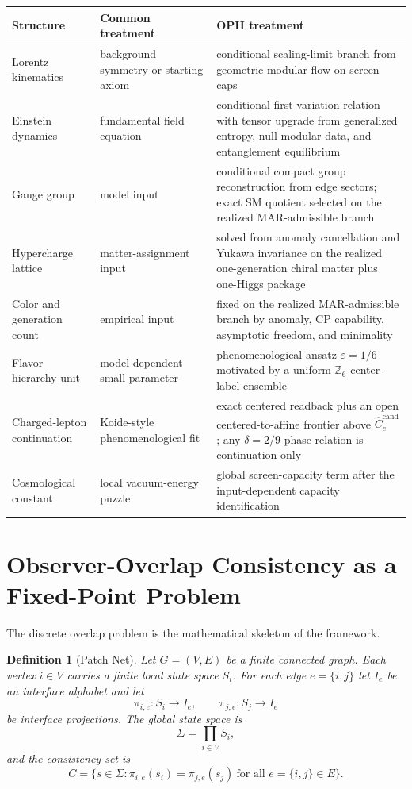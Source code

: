 \documentclass[11pt]{article}
\newtheorem{definition}[theorem]{Definition}
\begin{document}
\begingroup
\footnotesize
\begin{tabular}{@{}>{\raggedright\arraybackslash}p{}>{\raggedright\arraybackslash}p{}>{\raggedright\arraybackslash}p{}@{}}
\toprule
Structure & Common treatment & OPH treatment \\
\midrule
Lorentz kinematics & background symmetry or starting axiom & conditional scaling-limit branch from geometric modular flow on screen caps \\
Einstein dynamics & fundamental field equation & conditional first-variation relation with tensor upgrade from generalized entropy, null modular data, and entanglement equilibrium \\
Gauge group & model input & conditional compact group reconstruction from edge sectors; exact SM quotient selected on the realized MAR-admissible branch \\
Hypercharge lattice & matter-assignment input & solved from anomaly cancellation and Yukawa invariance on the realized one-generation chiral matter plus one-Higgs package \\
Color and generation count & empirical input & fixed on the realized MAR-admissible branch by anomaly, CP capability, asymptotic freedom, and minimality \\
Flavor hierarchy unit & model-dependent small parameter & phenomenological ansatz \(\varepsilon=1/6\) motivated by a uniform \(\mathbb Z_6\) center-label ensemble \\
Charged-lepton continuation & Koide-style phenomenological fit & exact centered readback plus an open centered-to-affine frontier above \(\widehat C_e^{\mathrm{cand}}\); any \(\delta=2/9\) phase relation is continuation-only \\
Cosmological constant & local vacuum-energy puzzle & global screen-capacity term after the input-dependent capacity identification \\
\bottomrule
\end{tabular}
\endgroup
\section{Observer-Overlap Consistency as a Fixed-Point Problem}

The discrete overlap problem is the mathematical skeleton of the framework.

\begin{definition}[Patch Net]\label{def:patchnet}
Let $G=(V,E)$ be a finite connected graph. Each vertex $i\in V$ carries a finite local state space $S_i$. For each edge $e=\{i,j\}$ let $I_e$ be an interface alphabet and let
\[
\pi_{i,e}:S_i\to I_e,
\qquad
\pi_{j,e}:S_j\to I_e
\]
be interface projections. The global state space is
\[
\Sigma=\prod_{i\in V} S_i,
\]
and the consistency set is
\[
C=\bigl\{s\in\Sigma:\pi_{i,e}(s_i)=\pi_{j,e}(s_j)\ \text{for all }e=\{i,j\}\in E\bigr\}.
\]
\end{definition}
\end{document}
